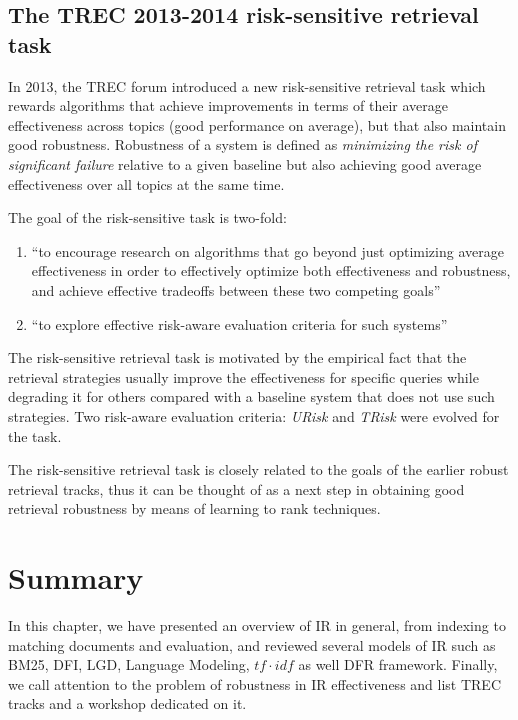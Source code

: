 \subsection{The TREC 2013-2014 risk-sensitive retrieval task}
In 2013, the TREC forum introduced a new risk-sensitive retrieval task \citep{2013web} which rewards algorithms that achieve improvements in terms of their average effectiveness across topics (good performance on average), but that also maintain good robustness.
Robustness of a system is defined as \emph{minimizing the risk of significant failure} relative to a given baseline but also achieving good average effectiveness over all topics at the same time.

The goal of the risk-sensitive task is two-fold:

\begin{enumerate}
\item ``to encourage research on algorithms that go beyond just optimizing average effectiveness in order to effectively optimize both effectiveness and robustness, and achieve effective tradeoffs between these two competing goals''
\item ``to explore effective risk-aware evaluation criteria for such systems''
\end{enumerate}

The risk-sensitive retrieval task is motivated by the empirical fact that the retrieval strategies usually improve the effectiveness for specific queries while degrading it for others compared with a baseline system that does not use such strategies.
Two risk-aware evaluation criteria: \emph{URisk} \citep{URisk} and \emph{TRisk} \citep{TRisk} were evolved for the task.

The risk-sensitive retrieval task is closely related to the goals of the earlier robust retrieval tracks, thus it can be thought of as a next step in obtaining good retrieval robustness by means of learning to rank techniques.

\section{Summary}

In this chapter, we have presented an overview of IR in general, from indexing to matching documents and evaluation, and reviewed several models of IR such as BM25, DFI, LGD, Language Modeling, $tf\cdot idf$ as well DFR framework.
Finally, we call attention to the problem of robustness in IR effectiveness and list TREC tracks and a workshop dedicated on it.




 


